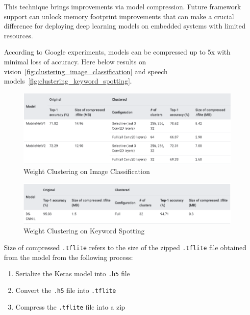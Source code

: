 This technique brings improvements via model compression. Future framework
support can unlock memory footprint improvements that can make a crucial
difference for deploying deep learning models on embedded systems with limited
resources.

According to Google experiments, models can be compressed up to 5x with minimal
loss of accuracy. Here below results on
vision~\autoref{fig:clustering_image_classification} and speech
models~\autoref{fig:clustering_keyword_spotting}.

\begin{figure}[ht]
    \includegraphics[width=\textwidth]{images/introduction/clustering_image_classification.png}
    \centering
    \caption{Weight Clustering on Image Classification}\label{fig:clustering_image_classification}
\end{figure}


\begin{figure}[ht]
    \includegraphics[width=\textwidth]{images/introduction/clustering_keyword_spotting.png}
    \centering
    \caption{Weight Clustering on Keyword Spotting}\label{fig:clustering_keyword_spotting}
\end{figure}

Size of compressed \texttt{.tflite} refers to the size of the zipped
\texttt{.tflite} file obtained from the model from the following process:

\begin{enumerate}
    \item Serialize the Keras model into \texttt{.h5} file
    \item Convert the \texttt{.h5} file into \texttt{.tflite}
    \item Compress the \texttt{.tflite} file into a zip
\end{enumerate}

